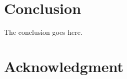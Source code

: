 \documentclass[conference]{IEEEtran}
\begin{document}
%






\section{Conclusion}
The conclusion goes here.






\section*{Acknowledgment}
\end{document}
